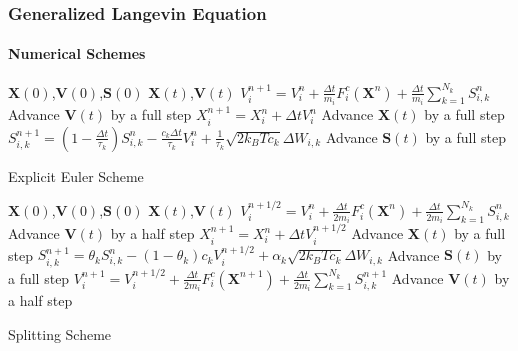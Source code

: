 \documentclass[a4paper,10pt]{beamer}
\newcommand{\BS}[1]{\boldsymbol{#1}}
\newcommand{\rb}[1]{\left( #1 \right)}
\begin{document}
	\begin{frame}
		\frametitle{Generalized Langevin Equation}
		\framesubtitle{Numerical Schemes}
			\vspace{-0.3cm}
			\begin{algorithm}[H]
				\scriptsize
				\renewcommand{\algorithmicrequire}{\textbf{Input:}}
				\renewcommand{\algorithmicensure}{\textbf{Output:}}
				\begin{algorithmic}[1]
					\Require $\BS{X}(0)$,$\BS{V}(0)$,$\BS{S}(0)$
					\Ensure $\BS{X}(t)$,$\BS{V}(t)$
					\tiny
						\State $V_{i}^{n+1} = V_{i}^{n} + \frac{\Delta t}{m_{i}} F_{i}^{c} \rb{\BS{X}^{n}}+\frac{\Delta t}{m_{i}} \sum_{k=1}^{N_{k}}S_{i,k}^{n}$
						\Comment Advance $\BS{V}(t)$ by a full step
						\State $X_{i}^{n+1} = X_{i}^{n} + \Delta t V_{i}^{n}$
						\Comment Advance $\BS{X}(t)$ by a full step
						\State $S_{i,k}^{n+1} = \rb{1-\frac{\Delta t}{\tau_{k}}}S_{i,k}^{n}-\frac{c_{k}\Delta t}{\tau_{k}}V_{i}^{n} + \frac{1}{\tau_{k}}\sqrt{2 k_{B} T c_{k}}\Delta W_{i,k}$
						\Comment Advance $\BS{S}(t)$ by a full step
					\scriptsize
					\EndFor
				\end{algorithmic}
				\caption*{\footnotesize Explicit Euler Scheme}
			\end{algorithm}
			\vspace{-0.75cm}
			\begin{algorithm}[H]
				\scriptsize
				\renewcommand{\algorithmicrequire}{\textbf{Input:}}
				\renewcommand{\algorithmicensure}{\textbf{Output:}}
				\begin{algorithmic}[1]
					\Require $\BS{X}(0)$,$\BS{V}(0)$,$\BS{S}(0)$
					\Ensure $\BS{X}(t)$,$\BS{V}(t)$
					\tiny
					\State $V_{i}^{n+1/2} = V_{i}^{n} + \frac{\Delta t}{2m_{i}} F_{i}^{c} \rb{\BS{X}^{n}}+\frac{\Delta t}{2m_{i}} \sum_{k=1}^{N_{k}}S_{i,k}^{n}$
					\Comment Advance $\BS{V}(t)$ by a half step
					\State $X_{i}^{n+1} = X_{i}^{n} + \Delta t V_{i}^{n+1/2}$
					\Comment Advance $\BS{X}(t)$ by a full step
					\State $S_{i,k}^{n+1} = \theta_{k} S_{i,k}^{n}-\rb{1-\theta_{k}}c_{k}V_{i}^{n+1/2} + \alpha_{k}\sqrt{2 k_{B} T c_{k}}\Delta W_{i,k}$
					\Comment Advance $\BS{S}(t)$ by a full step
					\State $V_{i}^{n+1} = V_{i}^{n+1/2} + \frac{\Delta t}{2m_{i}} F_{i}^{c} \rb{\BS{X}^{n+1}}+\frac{\Delta t}{2m_{i}} \sum_{k=1}^{N_{k}}S_{i,k}^{n+1}$
					\Comment Advance $\BS{V}(t)$ by a half step
					\scriptsize
					\EndFor
				\end{algorithmic}
				\caption*{\footnotesize Splitting Scheme}
			\end{algorithm}
	\end{frame}
\end{document}
